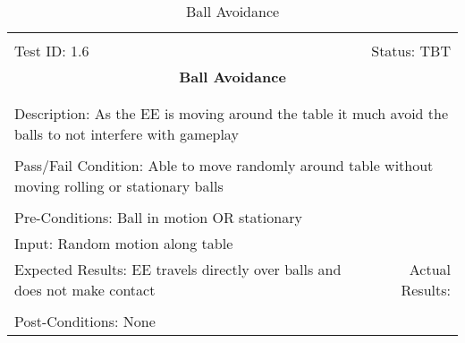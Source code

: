 \documentclass[titlepage]{article}
\begin{document}
\begin{center}%
\begin{table}[h!]
\begin{tabular}{|l r|}\hline&\\[-2mm]
	Test ID: 1.6	&Status: TBT\\[-3mm]
	\multicolumn{2}{|c|}{\textbf{\large{Ball Avoidance}}}\\&\\\hline&\\[-3mm]
	\multicolumn{2}{|p{\textwidth}|}{Description: As the EE is moving around the table it much avoid the balls to not interfere with gameplay}\\[1mm]\hline&\\[-3mm]
	\multicolumn{2}{|p{\textwidth}|}{Pass/Fail Condition: Able to move randomly around table without moving rolling or stationary balls}\\[1mm]\hline&\\[-3mm]
	\multicolumn{2}{|p{\textwidth}|}{Pre-Conditions: Ball in motion OR stationary}\\[4mm]
	\multicolumn{2}{|p{\textwidth}|}{Input: Random motion along table}\\[2mm]\hline
	\multicolumn{1}{|p{0.49\textwidth}}{Expected Results: EE travels directly over balls and does not make contact}	&\multicolumn{1}{|p{0.45\textwidth}|}{Actual Results:}\\\hline&\\[-3mm]
	\multicolumn{2}{|p{\textwidth}|}{Post-Conditions: None}\\\hline
\end{tabular}
\caption{Ball Avoidance}
\end{table}
\end{center}
\newpage
\end{document}
